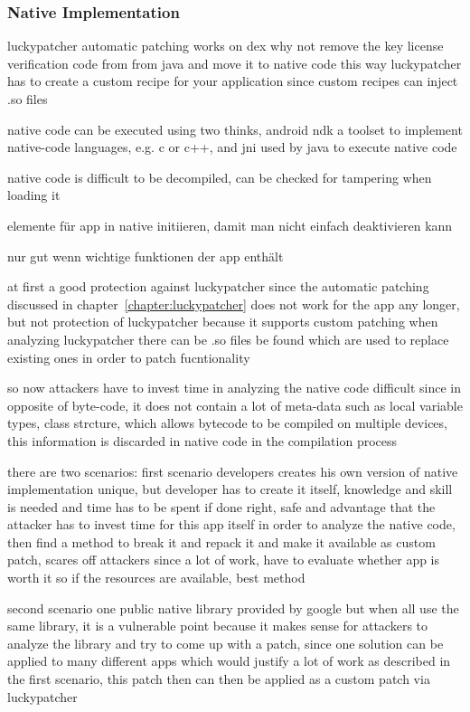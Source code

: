 \subsubsection{Native Implementation} \label{subsection:counter-modifications-dynamic}
luckypatcher automatic patching works on dex
why not remove the key license verification code from from java and move it to native code
this way luckypatcher has to create a custom recipe for your application since custom recipes can inject .so files

native code can be executed using two thinks, android ndk a toolset to implement native-code languages, e.g. c or c++, and  \gls{jni} used by java to execute native code

native code is difficult to be decompiled, can be checked for tampering when loading it

elemente für app in native initiieren, damit man nicht einfach deaktivieren kann

nur gut wenn wichtige funktionen der app enthält



at first a good protection against luckypatcher since the automatic patching discussed in chapter~\ref{chapter:luckypatcher} does not work for the app any longer, but not protection of luckypatcher because it supports custom patching
when analyzing luckypatcher there can be .so files be found which are used to replace existing ones in order to patch fucntionality

so now attackers have to invest time in analyzing the native code
difficult since in opposite of byte-code, it does not contain a lot of meta-data such as local variable types, class strcture, which allows bytecode to be compiled on multiple devices, this information is discarded in native code in the compilation process

there are two scenarios:
first scenario
developers creates his own version of native implementation
unique, but developer has to create it itself, knowledge and skill is needed and time has to be spent
if done right, safe and advantage that the attacker has to invest time for this app itself in order to analyze the native code, then find a method to break it and repack it and make it available as custom patch, scares off attackers since a lot of work, have to evaluate whether app is worth it
so if the resources are available, best method

second scenario
one public native library provided by google
but when all use the same library, it is a vulnerable point because it makes sense for attackers to analyze the library and try to come up with a patch, since one solution can be applied to many different apps which would justify a lot of work as described in the first scenario, this patch then can then be applied as a custom patch via luckypatcher

